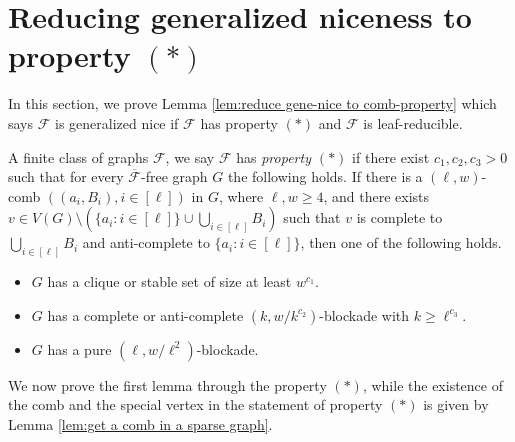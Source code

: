 \documentclass[a4paper,11pt]{article}
\begin{document}
\section{Reducing generalized niceness to property $(*)$}\label{sec:iterative-sparsification-1}

    In this section, we prove Lemma \ref{lem:reduce gene-nice to comb-property} which says $\mathcal{F}$ is generalized nice if $\mathcal{F}$ has property $(*)$ and $\mathcal{F}$ is leaf-reducible. 
    
    A finite class of graphs $\mathcal{F}$, we say $\mathcal{F}$ has {\em property $(*)$} if there exist $c_1,c_2,c_3>0$ such that for every $\overline{\mathcal{F}}$-free graph $G$ the following holds. If there is a $(\ell,w)$-comb $((a_i,B_i),i\in[\ell])$ in $G$, where $\ell,w\geq 4$, and there exists $v\in V(G)\setminus(\{a_i:i\in[\ell]\}\cup\bigcup_{i\in[\ell]}B_i)$ such that $v$ is complete to $\bigcup_{i\in[\ell]}B_i$ and anti-complete to $\{a_i:i\in[\ell]\}$, then one of the following holds.
    
    \begin{itemize}
        \item $G$ has a clique or stable set of size at least $w^{c_1}$.
        \item $G$ has a complete or anti-complete $(k,w/k^{c_2})$-blockade with $k\geq \ell^{c_3}$.
        \item $G$ has a pure $(\ell,w/\ell^{2})$-blockade.
    \end{itemize}
    
    We now prove the first lemma through the property $(*)$, while the existence of the comb and the special vertex in the statement of property $(*)$ is given by Lemma \ref{lem:get a comb in a sparse graph}.
    
\end{document}
